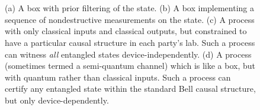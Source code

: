 \documentclass[prx,11pt,letterpaper,twocolumn,accepted=2023-11-27]{quantumarticle}
\theoremstyle{plain}
\theoremstyle{definition}
\begin{document}
 
\begin{figure}[htb]
\centering
   \hspace{1.3em} \\
    \\
    \caption{
(a) A box with prior filtering of the state. 
(b) A box implementing a sequence of nondestructive measurements on the state.     (c) A process with only classical inputs and classical outputs, but constrained to have a particular causal structure in each party's lab.  Such a process can witness {\em all} entangled states device-independently. (d) A process (sometimes termed a semi-quantum channel) which is like a box, but with quantum rather than classical inputs.  Such a process can certify any entangled state within the standard Bell causal structure, but only device-dependently.}
     \label{fig:filtering_sequences_etc}
\end{figure}
\end{document}
